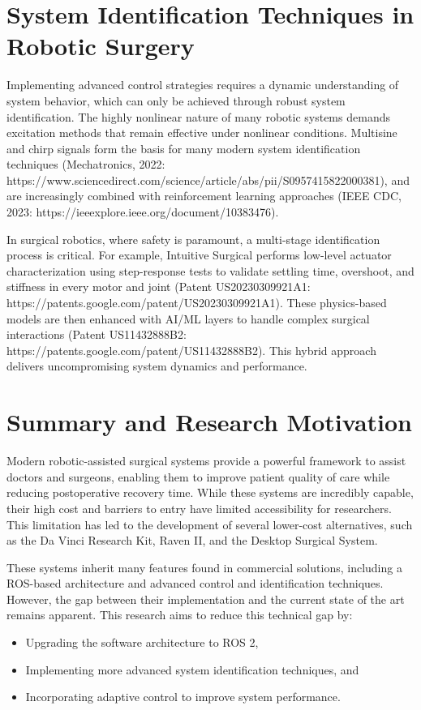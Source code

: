 \section{System Identification Techniques in Robotic Surgery}

Implementing advanced control strategies requires a dynamic understanding of system behavior, which can only be achieved through robust system identification. The highly nonlinear nature of many robotic systems demands excitation methods that remain effective under nonlinear conditions. Multisine and chirp signals form the basis for many modern system identification techniques (Mechatronics, 2022: https://www.sciencedirect.com/science/article/abs/pii/S0957415822000381), and are increasingly combined with reinforcement learning approaches (IEEE CDC, 2023: https://ieeexplore.ieee.org/document/10383476).

In surgical robotics, where safety is paramount, a multi-stage identification process is critical. For example, Intuitive Surgical performs low-level actuator characterization using step-response tests to validate settling time, overshoot, and stiffness in every motor and joint (Patent US20230309921A1: https://patents.google.com/patent/US20230309921A1). These physics-based models are then enhanced with AI/ML layers to handle complex surgical interactions (Patent US11432888B2: https://patents.google.com/patent/US11432888B2). This hybrid approach delivers uncompromising system dynamics and performance.

\section{Summary and Research Motivation}

Modern robotic-assisted surgical systems provide a powerful framework to assist doctors and surgeons, enabling them to improve patient quality of care while reducing postoperative recovery time. While these systems are incredibly capable, their high cost and barriers to entry have limited accessibility for researchers. This limitation has led to the development of several lower-cost alternatives, such as the Da Vinci Research Kit, Raven II, and the Desktop Surgical System.

These systems inherit many features found in commercial solutions, including a ROS-based architecture and advanced control and identification techniques. However, the gap between their implementation and the current state of the art remains apparent. This research aims to reduce this technical gap by:
\begin{itemize}
    \item Upgrading the software architecture to ROS 2,
    \item Implementing more advanced system identification techniques, and
    \item Incorporating adaptive control to improve system performance.
\end{itemize}